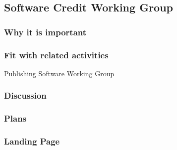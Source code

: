 \subsection{Software Credit Working Group}

\subsubsection{Why it is important}

\subsubsection{Fit with related activities}

Publishing Software Working Group

\subsubsection{Discussion}

\subsubsection{Plans}

\subsubsection{Landing Page}

